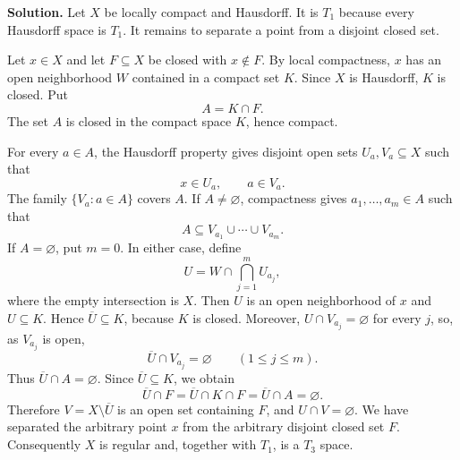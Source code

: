 \documentclass{article}
\newenvironment{solution}{\par\noindent\textbf{Solution.}\quad}{\par}
\begin{document}
\begin{solution}
  Let $X$ be locally compact and Hausdorff. It is $T_1$ because every
  Hausdorff space is $T_1$. It remains to separate a point from a disjoint
  closed set.

  Let $x\in X$ and let $F\subseteq X$ be closed with $x\notin F$.
  By local compactness, $x$ has an open neighborhood $W$ contained in a
  compact set $K$. Since $X$ is Hausdorff, $K$ is closed. Put
  \[
    A=K\cap F.
  \]
  The set $A$ is closed in the compact space $K$, hence compact.

  For every $a\in A$, the Hausdorff property gives disjoint open sets
  $U_a,V_a\subseteq X$ such that
  \[
    x\in U_a,\qquad a\in V_a.
  \]
  The family $\{V_a:a\in A\}$ covers $A$. If $A\ne\varnothing$,
  compactness gives $a_1,\ldots,a_m\in A$ such that
  \[
    A\subseteq V_{a_1}\cup\cdots\cup V_{a_m}.
  \]
  If $A=\varnothing$, put $m=0$. In either case, define
  \[
    U=W\cap\bigcap_{j=1}^m U_{a_j},
  \]
  where the empty intersection is $X$.
  Then $U$ is an open neighborhood of $x$ and $U\subseteq K$. Hence
  $\overline{U}\subseteq K$, because $K$ is closed. Moreover,
  $U\cap V_{a_j}=\varnothing$ for every $j$, so, as $V_{a_j}$ is open,
  \[
    \overline{U}\cap V_{a_j}=\varnothing\qquad (1\le j\le m).
  \]
  Thus $\overline{U}\cap A=\varnothing$. Since $\overline{U}\subseteq K$,
  we obtain
  \[
    \overline{U}\cap F
    =\overline{U}\cap K\cap F
    =\overline{U}\cap A
    =\varnothing.
  \]
  Therefore $V=X\setminus\overline{U}$ is an open set containing $F$, and
  $U\cap V=\varnothing$. We have separated the arbitrary point $x$ from
  the arbitrary disjoint closed set $F$. Consequently $X$ is regular and,
  together with $T_1$, is a $T_3$ space.
\end{solution}
\end{document}
